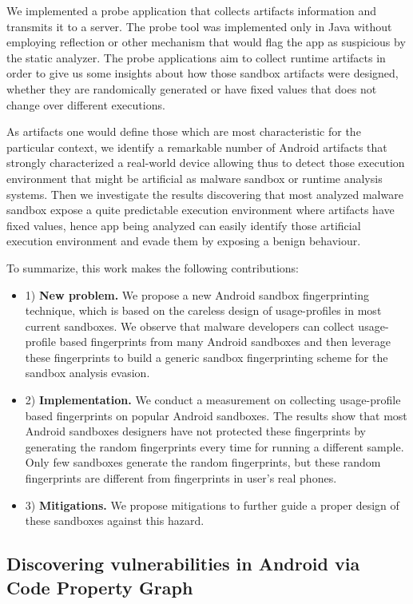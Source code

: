 We implemented a probe application that collects artifacts information and transmits it to a server. The probe tool was implemented only in Java without employing reflection or other mechanism that would flag the app as suspicious by the static analyzer. The probe applications aim to collect runtime artifacts in order to give us some insights about how those sandbox artifacts were designed, whether they are randomically generated or have fixed values that does not change over different executions. 

As artifacts one would define those which are most characteristic for the particular context, we identify a remarkable number of Android artifacts that strongly characterized a real-world device allowing thus to detect those execution environment that might be artificial as malware sandbox or runtime analysis systems. Then we investigate the results discovering that most analyzed malware sandbox expose a quite predictable execution environment where artifacts have fixed values, hence app being analyzed can easily identify those artificial execution environment and evade them by exposing a benign behaviour.

To summarize, this work makes the following contributions:
\begin{itemize}
\item 1) {\bf New problem.} We propose a new Android sandbox fingerprinting technique, which is based on the careless design of usage-profiles in most current sandboxes. We observe that malware developers can collect usage-profile based fingerprints from many Android sandboxes and then leverage these fingerprints to build a generic sandbox fingerprinting scheme for the sandbox analysis evasion. 
\item 2) {\bf Implementation.} We conduct a measurement on collecting usage-profile based fingerprints on popular Android sandboxes. The results show that most Android sandboxes designers have not protected these fingerprints by generating the random fingerprints every time for running a different sample. Only few sandboxes generate the random fingerprints, but these random fingerprints are different from fingerprints in user's real phones.
\item 3) {\bf Mitigations.} We propose mitigations to further guide a proper design of these sandboxes against this hazard.
\end{itemize}

\subsection{Discovering vulnerabilities in Android via Code Property Graph}

